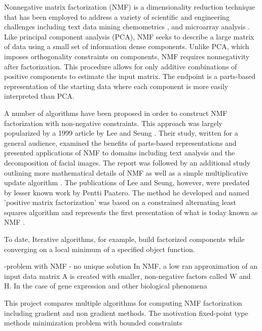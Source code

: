 \documentclass[final,leqno,onefignum,onetabnum]{siamltex1213}
\begin{document}
Nonnegative matrix factorization (NMF) is a dimensionality reduction technique that  has been employed to address a variety of scientific and engineering challenges including text data mining \cite{Pau,Lan,LeSe1} chemometrics \cite{Paa1,Paa2}, and microarray analysis \cite{Bur}. Like principal component analysis (PCA), NMF seeks to describe a large matrix of data using a small set of information dense components. Unlike PCA, which imposes orthogonality constraints on components, NMF requires nonnegativity after factorization. This procedure allows for only additive combinations of positive components to estimate the input matrix. The endpoint is a parts-based representation of the starting data where each component is more easily interpreted than PCA. 

A number of algorithms have been proposed in order to construct NMF factorization with non-negative constraints. This approach was largely popularized by a 1999 article by Lee and Seung \cite{LeSe1}. Their study, written for a general audience, examined the benefits of parts-based representations and presented applications of NMF to domains including text analysis and the decomposition of facial images. The report was followed by an additional study outlining more mathematical details of NMF as well as a simple multiplicative update algorithm \cite{LeSe2}. The publications of Lee and Seung, however, were predated by lesser known work by Pentti Paatero. The method he developed and named 'positive matrix factorization' was based on a constrained alternating least squares algorithm and represents the first presentation of what is today known as NMF \cite{Paa1,Paa2}. 



To date, 
Iterative algorithms, for example, build factorized components while converging on a local minimum of a specified object function. 

-problem with NMF - no unique solution 
In NMF, a low ran approximation of an input data matrix A is created with smaller, non-negative factors called W and H. 
In the case of gene expression and other biological phenomena 

This project compares multiple algorithms for computing NMF factorization including gradient and non gradient methods. The motivation 
fixed-point type methods 
minimization problem with bounded constraints 
\end{document}
